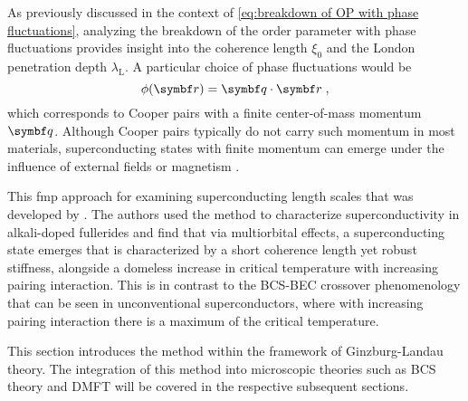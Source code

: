 \documentclass[../main.tex]{subfiles}
\begin{document}
As previously discussed in the context of \cref{eq:breakdown of OP with phase fluctuations}, analyzing the breakdown of the order parameter with phase fluctuations provides insight into the coherence length \(\xi_0\) and the London penetration depth \(\lambda_{\mathrm{L}}\).
A particular choice of phase fluctuations would be
\begin{equation}
	\phi (\vb{r}) = \vb{q} \cdot \vb{r} \;,
	\label{eq:phase fluctuations for finite momentum pairing}
\end{equation}
which corresponds to Cooper pairs with a finite center-of-mass momentum \(\vb{q}\).
Although Cooper pairs typically do not carry such momentum in most materials, superconducting states with finite momentum can emerge under the influence of external fields or magnetism \cite{chenFiniteMomentumCooper2018, wanOrbitalFuldeFerrell2023, yuanSupercurrentDiodeEffect2022}.

This \gls{fmp} approach for examining superconducting length scales that was developed by \citeauthor{wittBypassingLatticeBCS2024} \cite{wittBypassingLatticeBCS2024}.
The authors used the method to characterize superconductivity in alkali-doped fullerides and find that via multiorbital effects, a superconducting state emerges that is characterized by a short coherence length yet robust stiffness, alongside a domeless increase in critical temperature with increasing pairing interaction.
This is in contrast to the BCS-BEC crossover phenomenology that can be seen in unconventional superconductors, where with increasing pairing interaction there is a maximum of the critical temperature.

This section introduces the method within the framework of Ginzburg-Landau theory.
The integration of this method into microscopic theories such as BCS theory and DMFT will be covered in the respective subsequent sections.
\end{document}

